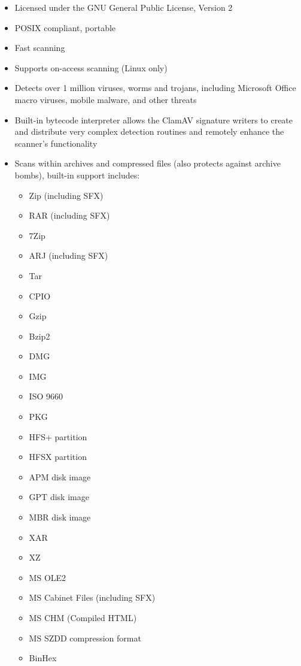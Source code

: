 \documentclass[a4paper,titlepage,12pt]{article}
\begin{document}
    \begin{itemize}
	\item{Licensed under the GNU General Public License, Version 2}
	\item{POSIX compliant, portable}
	\item{Fast scanning}
	\item{Supports on-access scanning (Linux only)}
	\item{Detects over 1 million viruses, worms and trojans, including
	      Microsoft Office macro viruses, mobile malware, and other threats}
	\item{Built-in bytecode interpreter allows the ClamAV signature writers
	      to create and distribute very complex detection routines and
	      remotely enhance the scanner's functionality}
	\item{Scans within archives and compressed files (also protects
	      against archive bombs), built-in support includes:
	    \begin{itemize}
		\item Zip (including SFX)
		\item RAR (including SFX)
		\item 7Zip
		\item ARJ (including SFX)
		\item Tar
		\item CPIO
		\item Gzip
		\item Bzip2
                \item DMG
                \item IMG
                \item ISO 9660
                \item PKG
                \item HFS+ partition
                \item HFSX partition
                \item APM disk image
                \item GPT disk image
                \item MBR disk image
                \item XAR
                \item XZ
		\item MS OLE2
		\item MS Cabinet Files (including SFX)
		\item MS CHM (Compiled HTML)
		\item MS SZDD compression format
		\item BinHex

\end{itemize}}
\end{itemize}
\end{document}
